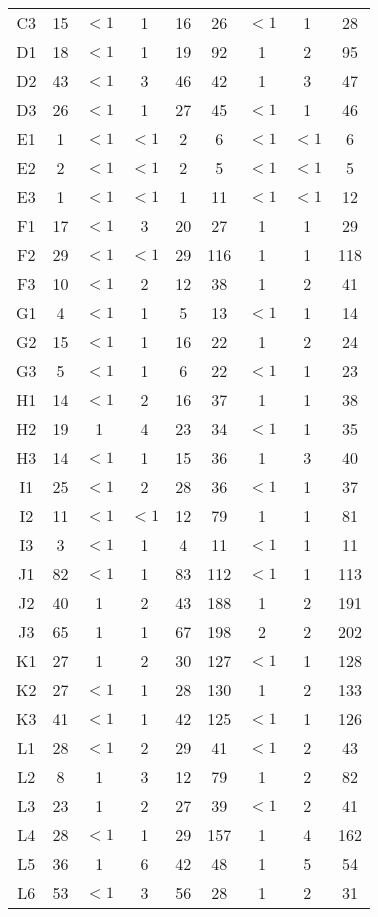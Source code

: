 \begin{center}
\begin{longtable}{ccccc|cccc}
C3&15&$<1$&1&16&26&$<1$&1&28\\
D1&18&$<1$&1&19&92&1&2&95\\
D2&43&$<1$&3&46&42&1&3&47\\
D3&26&$<1$&1&27&45&$<1$&1&46\\
E1&1&$<1$&$<1$&2&6&$<1$&$<1$&6\\
E2&2&$<1$&$<1$&2&5&$<1$&$<1$&5\\
E3&1&$<1$&$<1$&1&11&$<1$&$<1$&12\\
F1&17&$<1$&3&20&27&1&1&29\\
F2&29&$<1$&$<1$&29&116&1&1&118\\
F3&10&$<1$&2&12&38&1&2&41\\
G1&4&$<1$&1&5&13&$<1$&1&14\\
G2&15&$<1$&1&16&22&1&2&24\\
G3&5&$<1$&1&6&22&$<1$&1&23\\
H1&14&$<1$&2&16&37&1&1&38\\
H2&19&1&4&23&34&$<1$&1&35\\
H3&14&$<1$&1&15&36&1&3&40\\
I1&25&$<1$&2&28&36&$<1$&1&37\\
I2&11&$<1$&$<1$&12&79&1&1&81\\
I3&3&$<1$&1&4&11&$<1$&1&11\\
J1&82&$<1$&1&83&112&$<1$&1&113\\
J2&40&1&2&43&188&1&2&191\\
J3&65&1&1&67&198&2&2&202\\
K1&27&1&2&30&127&$<1$&1&128\\
K2&27&$<1$&1&28&130&1&2&133\\
K3&41&$<1$&1&42&125&$<1$&1&126\\
L1&28&$<1$&2&29&41&$<1$&2&43\\
L2&8&1&3&12&79&1&2&82\\
L3&23&1&2&27&39&$<1$&2&41\\
L4&28&$<1$&1&29&157&1&4&162\\
L5&36&1&6&42&48&1&5&54\\
L6&53&$<1$&3&56&28&1&2&31\\
\end{longtable}
\end{center}


